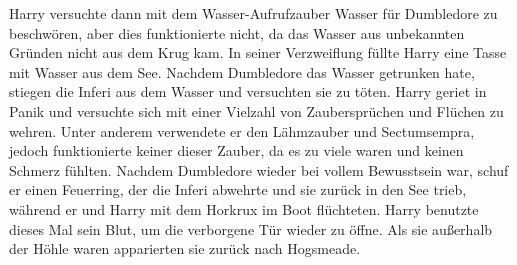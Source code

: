 \documentclass[a4paper, 10pt]{article}
\begin{document}
\vspace{10pt}
\newline
{}  
Harry versuchte dann mit dem Wasser-Aufrufzauber Wasser für Dumbledore zu beschwören, aber dies funktionierte nicht, da das Wasser aus unbekannten Gründen nicht aus dem Krug kam. In seiner Verzweiflung füllte Harry eine Tasse mit Wasser aus dem See. Nachdem Dumbledore das Wasser getrunken hate, stiegen die Inferi aus dem Wasser und versuchten sie zu töten. Harry geriet in Panik und versuchte sich mit einer Vielzahl von Zaubersprüchen und Flüchen zu wehren. Unter anderem verwendete er den Lähmzauber und Sectumsempra, jedoch funktionierte keiner dieser Zauber, da es zu viele waren und keinen Schmerz fühlten. Nachdem Dumbledore wieder bei vollem Bewusstsein war, schuf er einen Feuerring, der die Inferi abwehrte und sie zurück in den See trieb, während er und Harry mit dem Horkrux im Boot flüchteten. Harry benutzte dieses Mal sein Blut, um die verborgene Tür wieder zu öffne. Als sie außerhalb der Höhle waren apparierten sie zurück nach Hogsmeade.
\end{document}
